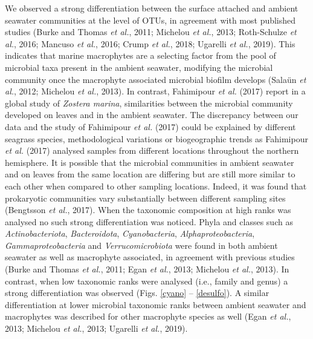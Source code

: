 \documentclass[12pt,]{article}
\begin{document}
We observed a strong differentiation between the surface attached and
ambient seawater communities at the level of OTUs, in agreement with
most published studies (Burke and Thomas \emph{et al.}, 2011; Michelou
\emph{et al.}, 2013; Roth-Schulze \emph{et al.}, 2016; Mancuso \emph{et
al.}, 2016; Crump \emph{et al.}, 2018; Ugarelli \emph{et al.}, 2019).
This indicates that marine macrophytes are a selecting factor from the
pool of microbial taxa present in the ambient seawater, modifying the
microbial community once the macrophyte associated microbial biofilm
develops (Salaün \emph{et al.}, 2012; Michelou \emph{et al.}, 2013). In
contrast, Fahimipour \emph{et al.} (2017) report in a global study of
\emph{Zostera marina}, similarities between the microbial community
developed on leaves and in the ambient seawater. The discrepancy between
our data and the study of Fahimipour \emph{et al.} (2017) could be
explained by different seagrass species, methodological variations or
biogeographic trends as Fahimipour \emph{et al.} (2017) analysed samples
from different locations throughout the northern hemisphere. It is
possible that the microbial communities in ambient seawater and on
leaves from the same location are differing but are still more similar
to each other when compared to other sampling locations. Indeed, it was
found that prokaryotic communities vary substantially between different
sampling sites (Bengtsson \emph{et al.}, 2017). When the taxonomic
composition at high ranks was analysed no such strong differentiation
was noticed. Phyla and classes such as \emph{Actinobacteriota},
\emph{Bacteroidota}, \emph{Cyanobacteria}, \emph{Alphaproteobacteria},
\emph{Gammaproteobacteria} and \emph{Verrucomicrobiota} were found in
both ambient seawater as well as macrophyte associated, in agreement
with previous studies (Burke and Thomas \emph{et al.}, 2011; Egan
\emph{et al.}, 2013; Michelou \emph{et al.}, 2013). In contrast, when
low taxonomic ranks were analysed (i.e., family and genus) a strong
differentiation was observed (Figs. \ref{cyano} -- \ref{desulfo}). A
similar differentiation at lower microbial taxonomic ranks between
ambient seawater and macrophytes was described for other macrophyte
species as well (Egan \emph{et al.}, 2013; Michelou \emph{et al.}, 2013;
Ugarelli \emph{et al.}, 2019).
\end{document}
